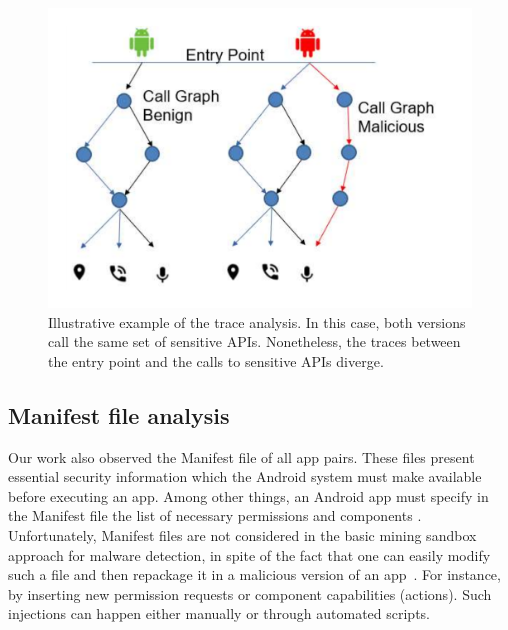 \begin{figure}[ht]
\centering
\includegraphics[scale=0.25]{images/maliciousCallGraph.pdf}
\caption{Illustrative example of the trace analysis. In this case, both versions call the same set of sensitive APIs. Nonetheless,
 the traces between the entry point and the calls to sensitive APIs diverge.}
 \label{fig:callGraph}
\end{figure}


\subsection{Manifest file analysis}\label{sec:manifestAnalysis}

Our work also observed the Manifest file of all app pairs. These files present essential security information which the Android system must make available before executing an app. Among other things, an Android app must specify in the Manifest file the list of necessary permissions and components . Unfortunately, Manifest files are not considered in the basic mining sandbox approach for malware detection, in spite of the fact that one can easily modify such a file and then repackage it in a malicious version of an app~\cite{DBLP:journals/corr/abs-1208-4536}. For instance, by inserting new permission requests or component capabilities (actions). Such injections can happen either manually or through automated scripts.



